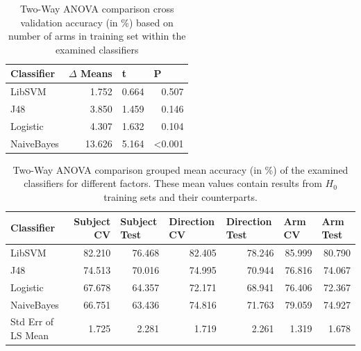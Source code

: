 \documentclass[journal]{IEEEtran}
\begin{document}
\begin{table}
\centering
\begin{tabular}{lrrr}
\textbf{Classifier} & \textbf{$\Delta$ Means} & \multicolumn{1}{l}{\textbf{t}} & \multicolumn{1}{l}{\textbf{P}} \\
\hline
LibSVM              & 1.752                  & 0.664                          & 0.507                          \\
J48                 & 3.850                  & 1.459                          & 0.146                          \\
Logistic            & 4.307                  & 1.632                          & 0.104                          \\
NaiveBayes          & 13.626                 & 5.164                          & \textless0.001                
\end{tabular}
\caption{Two-Way ANOVA comparison cross validation accuracy (in \%) based on number of arms in training set within the examined classifiers}
\label{tab:anova-arm}
\end{table}

\begin{table}[t]
\centering
\begin{tabular}{lrrrrrr}
\textbf{Classifier} & \textbf{Subject CV} & \multicolumn{1}{l}{\textbf{Subject Test}} & \multicolumn{1}{l}{\textbf{Direction CV}} & \multicolumn{1}{l}{\textbf{Direction Test}} & \multicolumn{1}{l}{\textbf{Arm CV}} & \multicolumn{1}{l}{\textbf{Arm Test}} \\
\hline
LibSVM              & 82.210            & 76.468                                  & 82.405                                  & 78.246                                    & 85.999                            & 80.790                              \\
J48                 & 74.513            & 70.016                                  & 74.995                                  & 70.944                                    & 76.816                            & 74.067                              \\
Logistic            & 67.678            & 64.357                                  & 72.171                                  & 68.941                                    & 76.406                            & 72.367                              \\
NaiveBayes          & 66.751            & 63.436                                  & 74.816                                  & 71.763                                    & 79.059                            & 74.927                              \\
\hline
Std Err of LS Mean  & 1.725               & 2.281                                     & 1.719                                     & 2.261                                       & 1.319                               & 1.678                                
\end{tabular}
\caption{Two-Way ANOVA comparison grouped mean accuracy (in \%) of the examined classifiers for different factors. These mean values contain results from $H_0$ training sets and their counterparts.}
\label{tab:anova-mean-accuracy}
\end{table}
\end{document}
